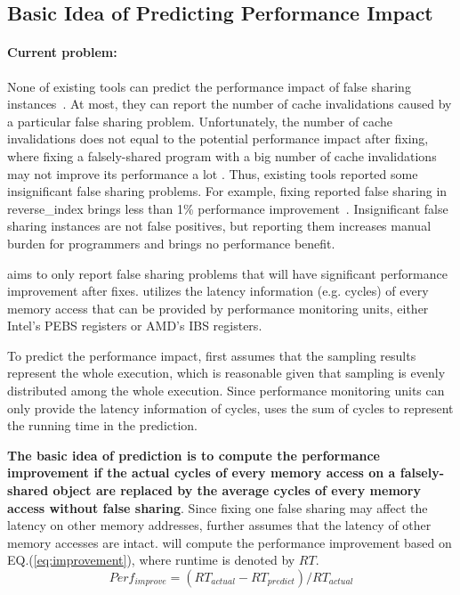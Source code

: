 \subsection{Basic Idea of Predicting Performance Impact}
\label{sec:predictidea}

\paragraph{Current problem:} None of existing tools can predict the performance impact of false sharing instances~\cite{sheriff, Predator, openmp}. At most, they can report the number of cache invalidations caused by a particular false sharing problem. Unfortunately, the number of cache invalidations does not equal to the potential performance impact after fixing, where fixing a falsely-shared program with a big number of cache invalidations may not improve its performance a lot . Thus, existing tools reported some insignificant false sharing problems. For example, fixing reported false sharing in reverse\_index brings less than 1\% performance improvement~\cite{sheriff, Predator}. Insignificant false sharing instances are not false positives, but reporting them increases manual burden for programmers and brings no performance benefit. 

\Cheetah{} aims to only report false sharing problems that will have significant performance improvement after fixes. \Cheetah{} utilizes the latency information (e.g. cycles) of every memory access that can be provided by performance monitoring units, either Intel's PEBS registers or AMD's IBS registers. 

To predict the performance impact, \Cheetah{} first assumes that the sampling results represent the whole execution, which is reasonable given that sampling is evenly distributed among the whole execution. Since performance monitoring units can only provide the latency information of cycles, \Cheetah{} uses the sum of cycles to represent the running time in the prediction.  

{\bf The basic idea of prediction is to compute the performance improvement if the actual cycles of every memory access on a
falsely-shared object are replaced by the average cycles of every memory access without false sharing}. Since fixing one false sharing may affect the latency on other memory addresses, \cheetah{} further assumes that the latency of other memory accesses are intact. \cheetah{} will compute the performance improvement based on EQ.(\ref{eq:improvement}), where runtime is denoted by $RT$. 
\begin{equation}
\label{eq:improvement}
Perf_{improve}=(RT_{actual} - RT_{predict})/RT_{actual}
\end{equation} 


